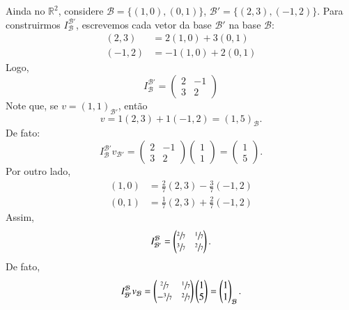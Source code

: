 \begin{exemplo*}
	Ainda no ${\mathbb{R}}^2$, considere ${\mathcal{B}} = \{(1,0),(0,1)\}$, ${\mathcal{B}}'=\{(2,3),(-1,2)\}$. Para construirmos $I_{\mathcal{B}}^{{\mathcal{B}}'}$, escrevemos cada vetor da base ${\mathcal{B}}'$ na base ${\mathcal{B}}$:
    \begin{align*}
    	(2,3) & = 2(1,0)+3(0,1)\\
        (-1,2) & = -1(1,0)+2(0,1)
    \end{align*}
    Logo,
    \begin{equation*}
    	I_{\mathcal{B}}^{{\mathcal{B}}'} = \begin{pmatrix} 2 & -1\\3 & 2\end{pmatrix}
    \end{equation*}
    Note que, se $v=(1,1)_{{\mathcal{B}}'}$, então
    \begin{equation*}
    	v = 1(2,3)+1(-1,2) = (1,5)_{\mathcal{B}}.
    \end{equation*}
    De fato:
    \begin{equation*}
    	I_{\mathcal{B}}^{{\mathcal{B}}'} v_{{\mathcal{B}}'} = \begin{pmatrix} 2 & -1\\3 & 2\end{pmatrix} \begin{pmatrix} 1\\1\end{pmatrix} = \begin{pmatrix} 1\\5\end{pmatrix}.
    \end{equation*}
    Por outro lado, 
    \begin{align*}
    	(1,0) & = \frac{2}{7}(2,3) - \frac{3}{7}(-1,2)\\
        (0,1) & = \frac{1}{7}(2,3) + \frac{2}{7}(-1,2)
    \end{align*}
    Assim,
    \begin{equation*}
    	I_{{\mathcal{B}}'}^{\mathcal{B}} = \begin{pmatrix} \sfrac{2}{7} & \sfrac{1}{7}\\\-\sfrac{3}{7} & \sfrac{2}{7}\end{pmatrix}.
    \end{equation*}
    De fato,
    \begin{equation*}
	    I_{{\mathcal{B}}'}^{\mathcal{B}}v_{\mathcal{B}} = \begin{pmatrix} \sfrac{2}{7} & \sfrac{1}{7}\\ -\sfrac{3}{7} & \sfrac{2}{7}\end{pmatrix} \begin{pmatrix} 1\\5\end{pmatrix} = \begin{pmatrix} 1\\1\end{pmatrix}_{\mathcal{B}}.

\end{equation*}
\end{exemplo*}
